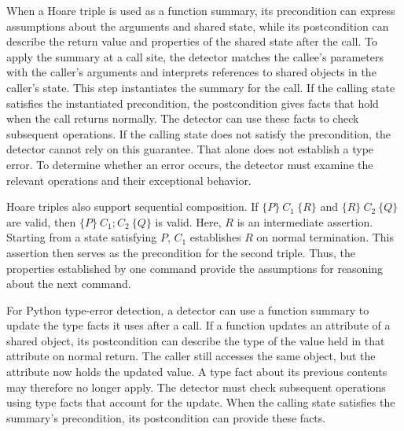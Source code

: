 When a Hoare triple is used as a function summary, its precondition can
express assumptions about the arguments and shared state, while its
postcondition can describe the return value and properties of the shared
state after the call.
To apply the summary at a call site, the detector matches the callee's
parameters with the caller's arguments and interprets references to
shared objects in the caller's state. This step instantiates the summary
for the call. If the calling state satisfies the instantiated
precondition, the postcondition gives facts that hold when the call
returns normally. The detector can use these facts to check subsequent
operations. If the calling state does not satisfy the precondition, the
detector cannot rely on this guarantee. That alone does not establish a
type error. To determine whether an error occurs, the detector must
examine the relevant operations and their exceptional behavior.

Hoare triples also support sequential composition. If
$\{P\}\ C_1\ \{R\}$ and $\{R\}\ C_2\ \{Q\}$ are valid, then
$\{P\}\ C_1; C_2\ \{Q\}$ is valid. Here, $R$ is an intermediate assertion.
Starting from a state satisfying $P$, $C_1$ establishes $R$ on normal
termination. This assertion then serves as the precondition for the
second triple. Thus, the properties established by
one command provide the assumptions for reasoning about the next command.

For Python type-error detection, a detector can use a function summary to
update the type facts it uses after a call. If a function updates an
attribute of a shared object, its postcondition can describe the type of
the value held in that attribute on normal return. The caller still
accesses the same object, but the attribute now holds the updated value.
A type fact about its previous contents may therefore no longer apply.
The detector must check subsequent operations using type facts that
account for the update. When the calling state satisfies the summary's
precondition, its postcondition can provide these facts.


